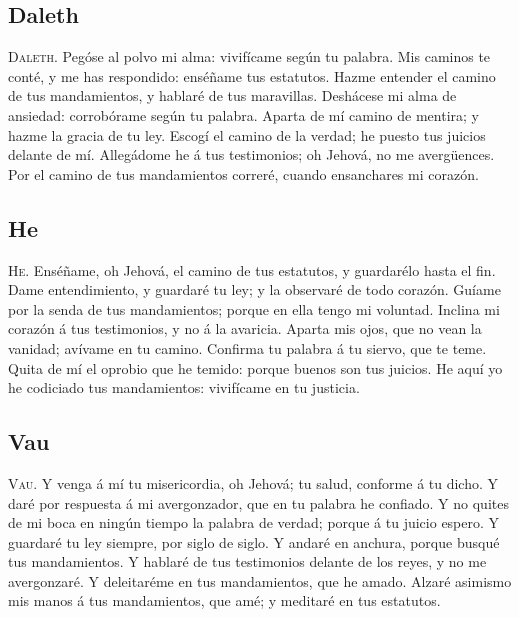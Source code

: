 \hypertarget{daleth}{%
\subsection{Daleth}\label{daleth}}

 \textsc{Daleth}. Pegóse al polvo mi alma: vivifícame
según tu palabra.  Mis caminos te conté, y me has
respondido: enséñame tus estatutos.  Hazme entender el
camino de tus mandamientos, y hablaré de tus maravillas. 
Deshácese mi alma de ansiedad: corrobórame según tu palabra.
 Aparta de mí camino de mentira; y hazme la gracia de tu
ley.  Escogí el camino de la verdad; he puesto tus
juicios delante de mí.  Allegádome he á tus testimonios;
oh Jehová, no me avergüences.  Por el camino de tus
mandamientos correré, cuando ensanchares mi corazón.

\hypertarget{he}{%
\subsection{He}\label{he}}

 \textsc{He}. Enséñame, oh Jehová, el camino de tus
estatutos, y guardarélo hasta el fin.  Dame
entendimiento, y guardaré tu ley; y la observaré de todo corazón.
 Guíame por la senda de tus mandamientos; porque en ella
tengo mi voluntad.  Inclina mi corazón á tus testimonios,
y no á la avaricia.  Aparta mis ojos, que no vean la
vanidad; avívame en tu camino.  Confirma tu palabra á tu
siervo, que te teme.  Quita de mí el oprobio que he
temido: porque buenos son tus juicios.  He aquí yo he
codiciado tus mandamientos: vivifícame en tu justicia.

\hypertarget{vau}{%
\subsection{Vau}\label{vau}}

 \textsc{Vau}. Y venga á mí tu misericordia, oh Jehová;
tu salud, conforme á tu dicho.  Y daré por respuesta á mi
avergonzador, que en tu palabra he confiado.  Y no quites
de mi boca en ningún tiempo la palabra de verdad; porque á tu juicio
espero.  Y guardaré tu ley siempre, por siglo de siglo.
 Y andaré en anchura, porque busqué tus mandamientos.
 Y hablaré de tus testimonios delante de los reyes, y no
me avergonzaré.  Y deleitaréme en tus mandamientos, que
he amado.  Alzaré asimismo mis manos á tus mandamientos,
que amé; y meditaré en tus estatutos.

